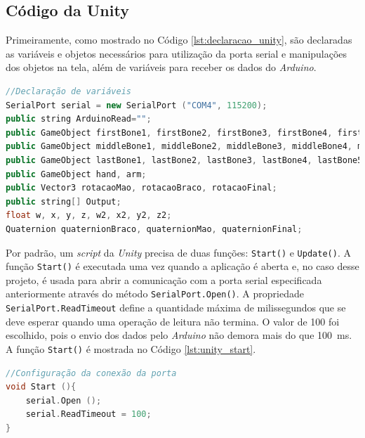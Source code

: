
\subsection{Código da Unity} %
\label{sub:codigo_da_unity}

Primeiramente, como mostrado no Código \ref{lst:declaracao_unity}, são declaradas as variáveis e objetos necessários para utilização da porta serial e manipulações dos objetos na tela, além de variáveis para receber os dados do \textit{Arduino}. 

\begin{lstlisting}[language=C++,label=lst:declaracao_unity,caption={Declaração de variáveis da \textit{Unity}},morekeywords={SerialPort,IsOpen,Close,Open,Quaternion,GameObject,Vector3,Split,transform,localEulerAngles,Parse,Set,eulerAngles}]
//Declaração de variáveis
SerialPort serial = new SerialPort ("COM4", 115200);
public string ArduinoRead="";
public GameObject firstBone1, firstBone2, firstBone3, firstBone4, firstBone5;
public GameObject middleBone1, middleBone2, middleBone3, middleBone4, middleBone5;
public GameObject lastBone1, lastBone2, lastBone3, lastBone4, lastBone5;
public GameObject hand, arm;
public Vector3 rotacaoMao, rotacaoBraco, rotacaoFinal;
public string[] Output;
float w, x, y, z, w2, x2, y2, z2;
Quaternion quaternionBraco, quaternionMao, quaternionFinal;
\end{lstlisting}

Por padrão, um \textit{script} da \textit{Unity} precisa de duas funções: \lstinline!Start()! e \lstinline!Update()!. A função \lstinline!Start()! é executada uma vez quando a aplicação é aberta e, no caso desse projeto, é usada para abrir a comunicação com a porta serial especificada anteriormente através do método \lstinline!SerialPort.Open()!. A propriedade \lstinline!SerialPort.ReadTimeout! define a quantidade máxima de milissegundos que se deve esperar quando uma operação de leitura não termina. O valor de 100 foi escolhido, pois o envio dos dados pelo \textit{Arduino} não demora mais do que \SI{100}{\milli\second}. A função \lstinline!Start()! é mostrada no Código \ref{lst:unity_start}.

\begin{lstlisting}[language=C++,label=lst:unity_start,caption={Função Start()},morekeywords={SerialPort,IsOpen,Close,Open,Quaternion,GameObject,Vector3,Split,transform,localEulerAngles,Parse,Set,eulerAngles,ReadTimeout}]
//Configuração da conexão da porta
void Start (){
	serial.Open ();
	serial.ReadTimeout = 100;
}
\end{lstlisting}


